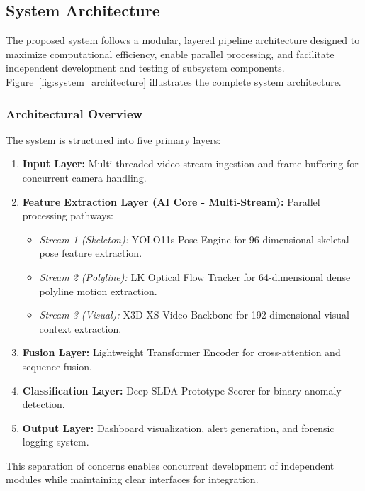 \documentclass[12pt]{article}
\begin{document}
\clearpage
\subsection{System Architecture}

The proposed system follows a modular, layered pipeline architecture designed to maximize computational efficiency, enable parallel processing, and facilitate independent development and testing of subsystem components. Figure~\ref{fig:system_architecture} illustrates the complete system architecture.

\subsubsection{Architectural Overview}

The system is structured into five primary layers:

\begin{enumerate}
    \item \textbf{Input Layer:} Multi-threaded video stream ingestion and frame buffering for concurrent camera handling.
    
    \item \textbf{Feature Extraction Layer (AI Core - Multi-Stream):} Parallel processing pathways:
    \begin{itemize}
        \item \textit{Stream 1 (Skeleton):} YOLO11s-Pose Engine for 96-dimensional skeletal pose feature extraction.
        \item \textit{Stream 2 (Polyline):} LK Optical Flow Tracker for 64-dimensional dense polyline motion extraction.
        \item \textit{Stream 3 (Visual):} X3D-XS Video Backbone for 192-dimensional visual context extraction.
    \end{itemize}
    
    \item \textbf{Fusion Layer:} Lightweight Transformer Encoder for cross-attention and sequence fusion.
    
    \item \textbf{Classification Layer:} Deep SLDA Prototype Scorer for binary anomaly detection.
    
    \item \textbf{Output Layer:} Dashboard visualization, alert generation, and forensic logging system.
\end{enumerate}

This separation of concerns enables concurrent development of independent modules while maintaining clear interfaces for integration.
\end{document}
